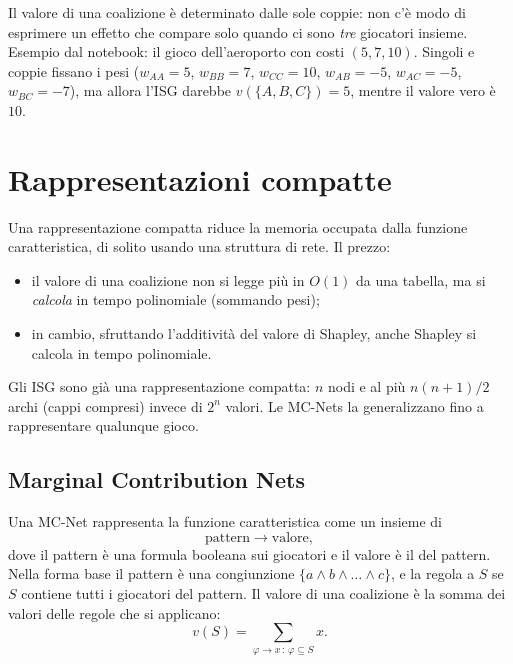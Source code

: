 \begin{attenzione}
Il valore di una coalizione è determinato dalle sole coppie: non c'è modo di esprimere un
effetto che compare solo quando ci sono \emph{tre} giocatori insieme. Esempio dal notebook:
il gioco dell'aeroporto con costi $(5, 7, 10)$. Singoli e coppie fissano i pesi
($w_{AA} = 5$, $w_{BB} = 7$, $w_{CC} = 10$, $w_{AB} = -5$, $w_{AC} = -5$, $w_{BC} = -7$),
ma allora l'ISG darebbe $v(\{A,B,C\}) = 5$, mentre il valore vero è $10$.
\end{attenzione}

\section{Rappresentazioni compatte}

Una rappresentazione compatta riduce la memoria occupata dalla funzione caratteristica,
di solito usando una struttura di rete. Il prezzo:
\begin{itemize}
  \item il valore di una coalizione non si legge più in $O(1)$ da una tabella, ma si
        \emph{calcola} in tempo polinomiale (sommando pesi);
  \item in cambio, sfruttando l'additività del valore di Shapley, anche Shapley si calcola
        in tempo polinomiale.
\end{itemize}
Gli ISG sono già una rappresentazione compatta: $n$ nodi e al più $n(n+1)/2$ archi (cappi
compresi) invece di $2^n$ valori. Le MC-Nets la generalizzano fino a rappresentare
qualunque gioco.

\subsection{Marginal Contribution Nets}

\begin{definizione}[MC-Net]
Una MC-Net rappresenta la funzione caratteristica come un insieme di 
\[
  \text{pattern} \longrightarrow \text{valore},
\]
dove il pattern è una formula booleana sui giocatori e il valore è il  del pattern. Nella forma base il pattern è una congiunzione
$\{a \land b \land \dots \land c\}$, e la regola  a $S$ se $S$ contiene
tutti i giocatori del pattern. Il valore di una coalizione è la somma dei valori delle
regole che si applicano:
\[
  v(S) = \sum_{\varphi \to x \,:\, \varphi \subseteq S} x.
\]
\end{definizione}

